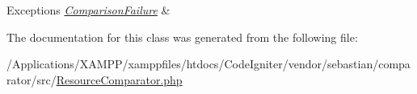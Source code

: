 \begin{DoxyExceptions}{Exceptions}
{\em \mbox{\hyperlink{class_sebastian_bergmann_1_1_comparator_1_1_comparison_failure}{Comparison\+Failure}}} & \\
\hline
\end{DoxyExceptions}


The documentation for this class was generated from the following file\+:\begin{DoxyCompactItemize}
\item 
/\+Applications/\+X\+A\+M\+P\+P/xamppfiles/htdocs/\+Code\+Igniter/vendor/sebastian/comparator/src/\mbox{\hyperlink{_resource_comparator_8php}{Resource\+Comparator.\+php}}\end{DoxyCompactItemize}
